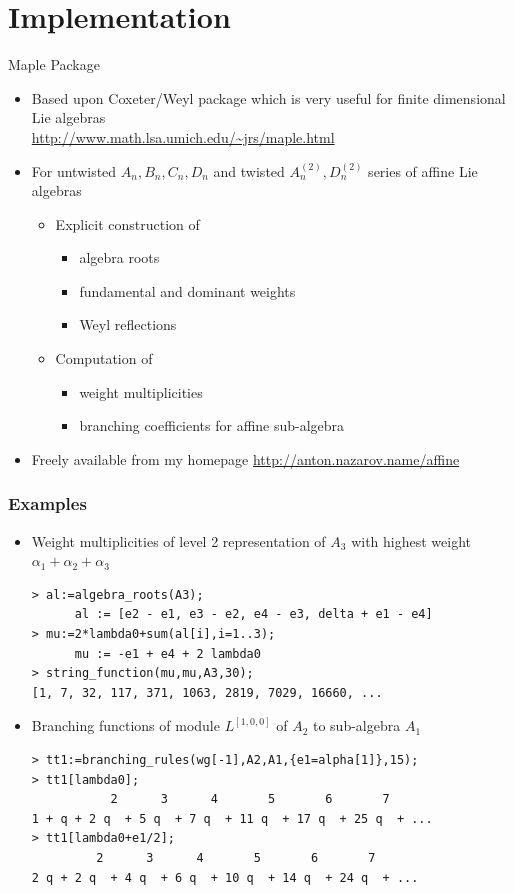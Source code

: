 \documentclass{beamer}
\theoremstyle{definition} \newtheorem{Def}{Definition}
\begin{document}
\section{Implementation}
\label{sec:implementation}
\begin{frame}{Maple Package}
  \begin{itemize}
  \item Based upon Coxeter/Weyl package which is very useful for finite dimensional Lie algebras\\
    \url{http://www.math.lsa.umich.edu/~jrs/maple.html}
  \item For untwisted $A_n,B_n,C_n,D_n$ and twisted $A_n^{(2)},D_n^{(2)}$ series of affine Lie algebras
    \begin{itemize}
    \item Explicit construction of
      \begin{itemize}
      \item algebra roots
      \item fundamental and dominant weights
      \item Weyl reflections
      \end{itemize}
    \item Computation of
      \begin{itemize}
      \item weight multiplicities
      \item branching coefficients for affine sub-algebra
      \end{itemize}
    \end{itemize}
  \item Freely available from my homepage \url{http://anton.nazarov.name/affine}
  \end{itemize}
\end{frame}
\begin{frame}[fragile]
  \frametitle{Examples}
  \begin{itemize}
  \item Weight multiplicities of level 2 representation of $A_3$ with highest weight $\alpha_1+\alpha_2+\alpha_3$
\begin{verbatim}
> al:=algebra_roots(A3);
      al := [e2 - e1, e3 - e2, e4 - e3, delta + e1 - e4]
> mu:=2*lambda0+sum(al[i],i=1..3);
      mu := -e1 + e4 + 2 lambda0
> string_function(mu,mu,A3,30);
[1, 7, 32, 117, 371, 1063, 2819, 7029, 16660, ...
\end{verbatim}
  \item Branching functions of module $L^{[1,0,0]}$ of $A_2$ to sub-algebra $A_1$ 
\begin{verbatim}
> tt1:=branching_rules(wg[-1],A2,A1,{e1=alpha[1]},15);
> tt1[lambda0];
           2      3      4       5       6       7 
1 + q + 2 q  + 5 q  + 7 q  + 11 q  + 17 q  + 25 q  + ...
> tt1[lambda0+e1/2];
         2      3      4       5       6       7   
2 q + 2 q  + 4 q  + 6 q  + 10 q  + 14 q  + 24 q  + ...
\end{verbatim}
  \end{itemize}


\end{frame}
\end{document}
